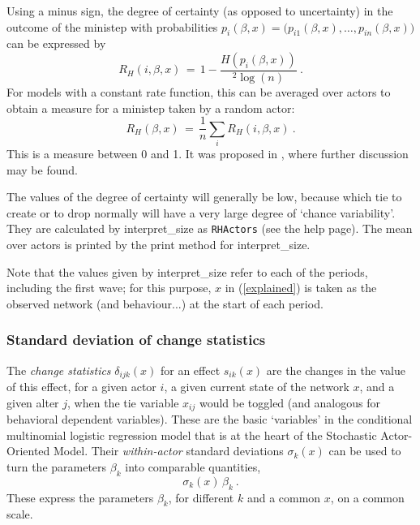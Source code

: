 \documentclass[a4paper,fleqn,11pt]{article}
\newcommand{\+}{\, + \,}
\newcommand{\sfn}[1]{\textsf{#1}}
\newcommand{\saom}{{Stochastic Actor-Oriented Model}}
\begin{document}
Using a minus sign, the degree of certainty (as opposed to uncertainty)
in the outcome of the ministep with probabilities
$p_{i}(\beta, x) = \big(p_{i1}(\beta, x), \ldots, p_{in}(\beta, x)\big)$
can be expressed by
\begin{equation}\label{uncertainty}
  R_H(i,\beta, x) \,=\,  1 - \frac{H(p_{i}(\beta, x))}{{}^2 \log(n)} \ .
\end{equation}
For models with a constant rate function, this can be averaged over
actors to obtain a measure for a ministep taken by a random actor:
\begin{equation}\label{explained}
  R_H(\beta, x) \,=\, \frac1n \sum_i R_H(i,\beta, x) \ .
\end{equation}
This is a measure between 0 and 1.
It was proposed in \citet{Snijders04}, where further discussion may be found.

The values of the degree of certainty will generally be low, because
which tie to create or to drop normally will have a very large
degree of `chance variability'.
They are calculated by  \sfn{interpret\_size} as \texttt{RHActors}
(see the help page). The mean over actors is printed by the print method
for \sfn{interpret\_size}.

Note that the values given by \sfn{interpret\_size} refer to each of the periods,
including the first wave; for this purpose, $x$ in (\ref{explained})
is taken as the observed network (and behaviour...) at the start of each period.


\subsubsection{Standard deviation of change statistics}

The  \emph{change statistics} $\delta_{ijk}(x)$
for an effect $s_{ik}(x)$ are the changes in the
value of this effect, for a given actor $i$, a given current state
of the network $x$, and a given alter $j$, when the
tie variable $x_{ij}$ would be toggled
(and analogous for behavioral dependent variables).
These are the basic `variables' in the conditional multinomial
logistic regression model that is at the heart of the \saom.
Their \emph{within-actor} standard deviations $\sigma_k(x)$
can be used to turn the parameters $\beta_k$ into
comparable quantities,
\begin{equation}
    \sigma_k(x) \, \beta_k  \ .   \label{standardized.beta}
\end{equation}
These express the parameters $\beta_k$, for different $k$ and a common $x$,
on a common scale.
\end{document}

